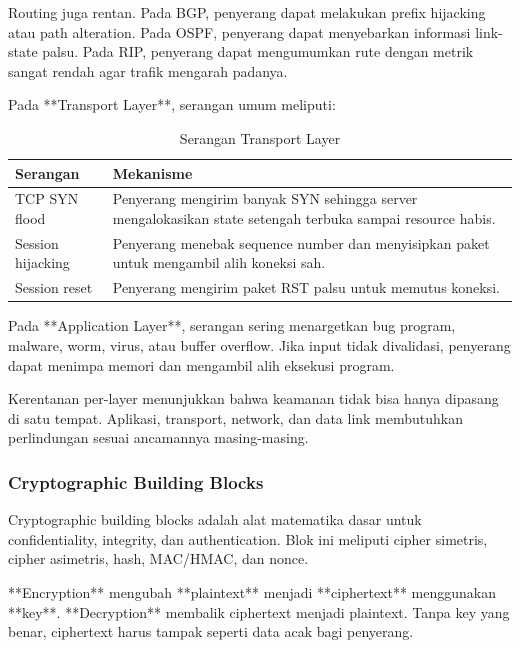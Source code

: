 Routing juga rentan. Pada BGP, penyerang dapat melakukan prefix hijacking atau path alteration. Pada OSPF, penyerang dapat menyebarkan informasi link-state palsu. Pada RIP, penyerang dapat mengumumkan rute dengan metrik sangat rendah agar trafik mengarah padanya.

Pada **Transport Layer**, serangan umum meliputi:
\begin{table}[H]
\centering
\begin{tabularx}{\textwidth}{|L{0.26\textwidth}|X|}
\hline
\textbf{Serangan} & \textbf{Mekanisme} \\
\hline
TCP SYN flood & Penyerang mengirim banyak SYN sehingga server mengalokasikan state setengah terbuka sampai resource habis. \\
\hline
Session hijacking & Penyerang menebak sequence number dan menyisipkan paket untuk mengambil alih koneksi sah. \\
\hline
Session reset & Penyerang mengirim paket RST palsu untuk memutus koneksi. \\
\hline
\end{tabularx}
\caption{Serangan Transport Layer}
\label{tab:transport-attacks}
\end{table}

Pada **Application Layer**, serangan sering menargetkan bug program, malware, worm, virus, atau buffer overflow. Jika input tidak divalidasi, penyerang dapat menimpa memori dan mengambil alih eksekusi program.

Kerentanan per-layer menunjukkan bahwa keamanan tidak bisa hanya dipasang di satu tempat. Aplikasi, transport, network, dan data link membutuhkan perlindungan sesuai ancamannya masing-masing.

\subsubsection{Cryptographic Building Blocks}
\begin{jawab}
Cryptographic building blocks adalah alat matematika dasar untuk confidentiality, integrity, dan authentication. Blok ini meliputi cipher simetris, cipher asimetris, hash, MAC/HMAC, dan nonce.
\end{jawab}

**Encryption** mengubah **plaintext** menjadi **ciphertext** menggunakan **key**. **Decryption** membalik ciphertext menjadi plaintext. Tanpa key yang benar, ciphertext harus tampak seperti data acak bagi penyerang.

